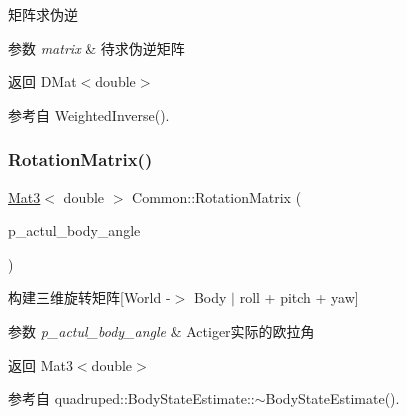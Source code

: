 矩阵求伪逆 


\begin{DoxyParams}{参数}
{\em matrix} & 待求伪逆矩阵 \\
\hline
\end{DoxyParams}
\begin{DoxyReturn}{返回}
D\+Mat$<$double$>$ 
\end{DoxyReturn}


参考自 Weighted\+Inverse().

\mbox{\label{classquadruped_1_1Common_a471c7074d56b4a2c856ff21e680e67a8}} 
\subsubsection{\texorpdfstring{Rotation\+Matrix()}{RotationMatrix()}}
{\footnotesize\ttfamily \hyperlink{cppTypes_8h_adb7d462b35d31f0b2583b3e230a2a2c3}{Mat3}$<$ double $>$ Common\+::\+Rotation\+Matrix (\begin{DoxyParamCaption}\item[{\hyperlink{cppTypes_8h_a65c27bf97693676535dd0b30ea0ad399}{Vec3}$<$ double $>$}]{p\+\_\+actul\+\_\+body\+\_\+angle }\end{DoxyParamCaption})\hspace{0.3cm}{\ttfamily [static]}}



构建三维旋转矩阵\mbox{[}World -\/$>$ Body $\vert$ roll + pitch + yaw\mbox{]} 


\begin{DoxyParams}{参数}
{\em p\+\_\+actul\+\_\+body\+\_\+angle} & Actiger实际的欧拉角 \\
\hline
\end{DoxyParams}
\begin{DoxyReturn}{返回}
Mat3$<$double$>$ 
\end{DoxyReturn}


参考自 quadruped\+::\+Body\+State\+Estimate\+::$\sim$\+Body\+State\+Estimate().

\mbox{\label{classquadruped_1_1Common_aa0a116c7c23dea6de2cd2dcd28b644b6}} 
